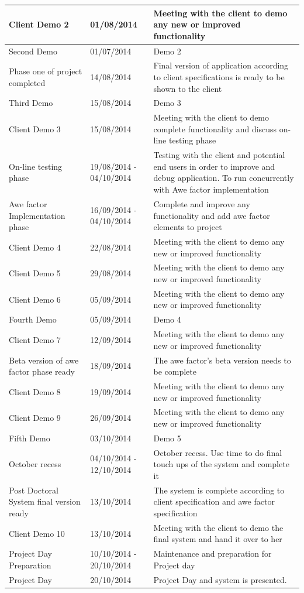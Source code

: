 \documentclass[12pt]{article}
\begin{document}
\begin{center}
\begin{longtable}{|p{3cm}|p{3cm}|p{9cm}|}
\hline
Client Demo 2 & 01/08/2014 & Meeting with the client to demo any new or improved functionality \\
\hline
Second Demo & 01/07/2014 & Demo 2 \\
\hline
Phase one of project completed & 14/08/2014 & Final version of application according to client specifications is ready to be shown to the client  \\
\hline
Third Demo & 15/08/2014 & Demo 3 \\
\hline
Client Demo 3 & 15/08/2014 & Meeting with the client to demo complete functionality and discuss on-line testing phase  \\
\hline
On-line testing phase & 19/08/2014 - 04/10/2014 & Testing with the client and potential end users in order to improve and debug application. To run concurrently with Awe factor implementation\\
\hline
Awe factor Implementation phase & 16/09/2014 - 04/10/2014 & Complete and improve any functionality and add awe factor elements to project\\
\hline
Client Demo 4 & 22/08/2014 & Meeting with the client to demo any new or improved functionality  \\
\hline
Client Demo 5 & 29/08/2014 & Meeting with the client to demo any new or improved functionality \\
\hline
Client Demo 6 & 05/09/2014 & Meeting with the client to demo any new or improved functionality\\
\hline
Fourth Demo & 05/09/2014 & Demo 4 \\
\hline
Client Demo 7 & 12/09/2014 & Meeting with the client to demo any new or improved functionality\\
\hline
Beta version of awe factor phase ready & 18/09/2014 & The awe factor's beta version needs to be complete\\
\hline
Client Demo 8 & 19/09/2014 & Meeting with the client to demo any new or improved functionality\\
\hline
Client Demo 9 & 26/09/2014 & Meeting with the client to demo any new or improved functionality\\
\hline
Fifth Demo & 03/10/2014 & Demo 5 \\
\hline
October recess & 04/10/2014 - 12/10/2014 & October recess. Use time to do final touch ups of the system and complete it\\
\hline
Post Doctoral System final version ready & 13/10/2014 & The system is complete according to client specification and awe factor specification \\
\hline
Client Demo 10 & 13/10/2014 & Meeting with the client to demo the final system and hand it over to her\\
\hline
Project Day Preparation & 10/10/2014 - 20/10/2014 & Maintenance and preparation for Project day  \\
\hline
Project Day & 20/10/2014 & Project Day and system is presented. \\
\hline


\end{longtable}
\end{center}
\end{document}
